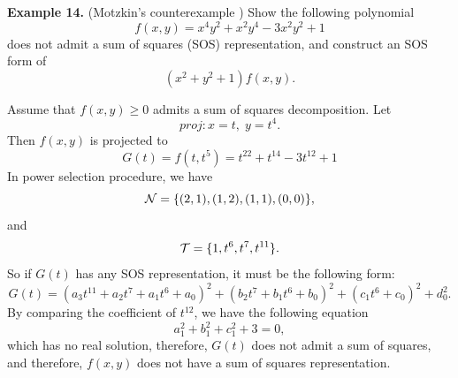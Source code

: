 \documentclass[runningheads]{llncs}
\begin{document}
{\textbf{Example 14. } 
(Motzkin's counterexample \cite{Motzkin1965}) 
Show the following polynomial
$$ f( {x,y} ) = {x}^{4}{y}^{2} + {x}^{2}{y}^{4} - 3{x}^{2}{y}^{2} + 1 $$
does not admit a sum of squares (SOS) representation, and construct an SOS form of 
$$
(x^2+y^2+1)f(x,y).
$$

Assume that $f(x,y) \ge 0$ admits a sum of squares decomposition. Let
$$
\textit{proj}: x=t,\; y=t^4.
$$
Then $f(x,y)$ is projected to
$$
G(t) = f(t,t^5) = t^{22} + t^{14} - 3 t^{12} + 1 
$$
In power selection procedure, we have
$$
{\cal N}=\{(2,1),(1,2),(1,1),(0,0)\}, 
$$
and
$$
{\cal T}=\{1, t^6, t^7, t^{11}\}.
$$
So if $G(t)$ has any SOS representation, 
it must be the following form:
$$ G(t)= \left( a_3 t^{11} + a_2 t^7 + a_1 t^6 + a_0 \right)^2 + \left( b_2 t^7 + b_1 t^6 + b_0 \right)^2 + \left( c_1 t^6 + c_0 \right)^2 + d_0^2. 
$$
By comparing the coefficient of $t^{12}$, we have the following equation 
$$
a_1^2 + b_1^2 + c_1^2 + 3=0,
$$
which has no real solution, therefore, 
$G(t)$ does not admit a sum of squares, and therefore, $f(x,y) $ does not have a sum of squares representation.

}
\end{document}
